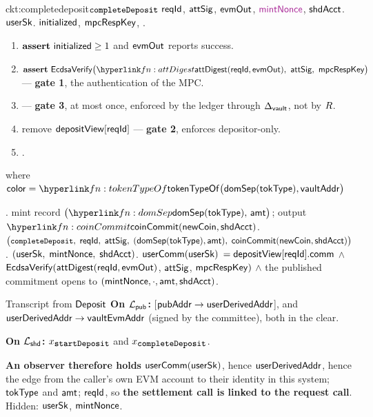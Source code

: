 \begin{CktBox}{ckt:completedeposit}{$\texttt{\small completeDeposit}$}
 $\mathsf{reqId}$, $\mathsf{attSig}$, $\mathsf{evmOut}$, $\freshrn{\mintNonce}$,  $\mathsf{shdAcct}$.
 $\mathsf{userSk}$.
 $\mathsf{initialized}$, $\mathsf{mpcRespKey}$, \ADDEDINL{$\depositMap$, $\depositView[\rid]$}.
\begin{enumerate}[nosep,leftmargin=1.7em,topsep=2pt]
\item $\textbf{assert}~ \mathsf{initialized} \geq 1$ and $\mathsf{evmOut}$ reports success.
\item $\assert \EcdsaVf\bigl(\lnk{fn:attDigest}{\attDigest(\rid, \evmOut)}\bc \attSig\bc
      \mpcRespKey\bigr)$ --- \textbf{gate 1}, the authentication of the MPC.
\item {} ---
      \textbf{gate 3}, at most once, enforced by the ledger through $\Delta_{\mathsf{vault}}$, not by $R$.
\item {} \;
      remove $\depositView[\rid]$ --- \textbf{gate 2}, enforces depositor-only.
\item {}.
\end{enumerate}
where  $\mathsf{color}=\lnk{fn:tokenTypeOf}{\tokenTypeOf}\bigl(\domSep(\tokType),
\vaultAddr\bigr)$
\begin{OutList}
\oitem{\Dvault} .
\oitem{\Dshd} \bluedot mint record $\bigl(\lnk{fn:domSep}{\domSep(\tokType)},\, \amt\bigr)$;
  \bluedot output  $\lnk{fn:coinCommit}{\coinCommit(\coinMint, \shdAcct)}$.
\oitem{\stmt} $\bigl(\texttt{\small completeDeposit},\; \mathsf{reqId},\; \mathsf{attSig},\;
  (\mathsf{domSep}(\mathsf{tokType}), \mathsf{amt}),\; \mathsf{coinCommit}(\mathsf{newCoin}, \mathsf{shdAcct})\bigr)$.
\oitem{\wit} $(\mathsf{userSk},\; \mathsf{mintNonce},\; \mathsf{shdAcct})$.
\oitem{\Rel} $\mathsf{userComm}(\mathsf{userSk})$ $= \mathsf{depositView}[\mathsf{reqId}].\mathsf{comm}$ \;$\wedge$\;
  $\mathsf{EcdsaVerify}(\mathsf{attDigest}(\mathsf{reqId},\mathsf{evmOut})$, $\mathsf{attSig}$, $\mathsf{mpcRespKey})$ \;$\wedge$\;
  the published commitment opens to $(\mathsf{mintNonce}, \cdot, \mathsf{amt}, \mathsf{shdAcct})$.
\end{OutList}
\end{CktBox}


\begin{PubBox}{Transcript from  $\mathsf{Deposit}$}
\textbf{On $\mathcal{L}_{\mathsf{pub}}$:} [$\mathsf{pubAddr} \to \mathsf{userDerivedAddr}$],  and
$\mathsf{userDerivedAddr} \to \mathsf{vaultEvmAddr}$ (signed by the committee), both in the clear.

\smallskip
\textbf{On $\mathcal{L}_{\mathsf{shd}}$:} $x_{\texttt{\small startDeposit}}$ and
$x_{\texttt{\small completeDeposit}}$.

\smallskip
\textbf{An observer therefore holds} $\mathsf{userComm}(\mathsf{userSk})$, hence $\mathsf{userDerivedAddr}$, hence the edge from
the caller's own EVM account to their identity in this system; $\mathsf{tokType}$ and $\mathsf{amt}$; $\mathsf{reqId}$, so \textbf{the settlement call is  linked
to the request call}. Hidden: $\mathsf{userSk}$, $\mathsf{mintNonce}$.
\end{PubBox}
